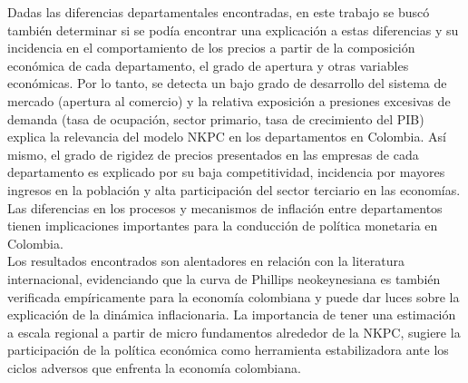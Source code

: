Dadas las diferencias departamentales encontradas, en este trabajo se buscó también determinar si se podía encontrar una explicación a estas diferencias y su incidencia en el comportamiento de los precios a partir de la composición económica de cada departamento, el grado de apertura y otras variables económicas. Por lo tanto, se detecta un bajo grado de desarrollo del sistema de mercado (apertura al comercio) y la relativa exposición a presiones excesivas de demanda (tasa de ocupación, sector primario, tasa de crecimiento del PIB) explica la relevancia del modelo NKPC en los departamentos en Colombia. Así mismo, el grado de  rigidez de precios presentados en las empresas de cada departamento es explicado por su baja competitividad, incidencia por mayores ingresos en la población  y alta participación del sector terciario en las economías. Las diferencias en los procesos y mecanismos de inflación entre departamentos tienen implicaciones importantes para la conducción de política monetaria en Colombia.\\

Los resultados encontrados son alentadores en relación con la literatura internacional, evidenciando que la curva de Phillips neokeynesiana es también verificada empíricamente para la economía colombiana y puede dar luces sobre la explicación de la dinámica inflacionaria. La importancia de tener una estimación a escala regional a partir de micro fundamentos alrededor de la NKPC, sugiere  la participación de la política económica como herramienta estabilizadora ante los ciclos adversos que enfrenta la economía colombiana.
